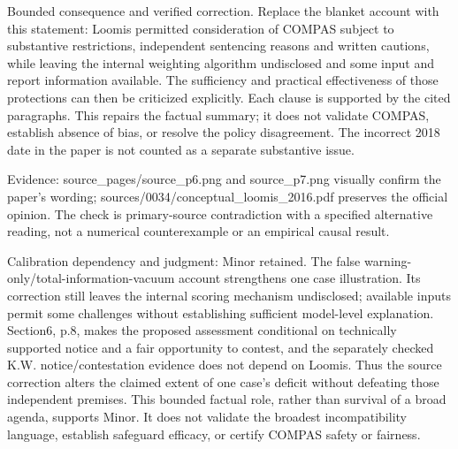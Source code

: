 \documentclass[10pt]{article}
\begin{document}
Bounded consequence and verified correction. Replace the blanket account with this statement: Loomis permitted consideration of COMPAS subject to substantive restrictions, independent sentencing reasons and written cautions, while leaving the internal weighting algorithm undisclosed and some input and report information available. The sufficiency and practical effectiveness of those protections can then be criticized explicitly. Each clause is supported by the cited paragraphs. This repairs the factual summary; it does not validate COMPAS, establish absence of bias, or resolve the policy disagreement. The incorrect 2018 date in the paper is not counted as a separate substantive issue.\par
Evidence: source\_pages/source\_p6.png and source\_p7.png visually confirm the paper’s wording; sources/0034/conceptual\_loomis\_2016.pdf preserves the official opinion. The check is primary-source contradiction with a specified alternative reading, not a numerical counterexample or an empirical causal result.\par
Calibration dependency and judgment: Minor retained. The false warning-only/total-information-vacuum account strengthens one case illustration. Its correction still leaves the internal scoring mechanism undisclosed; available inputs permit some challenges without establishing sufficient model-level explanation. Section6, p.8, makes the proposed assessment conditional on technically supported notice and a fair opportunity to contest, and the separately checked K.W. notice/contestation evidence does not depend on Loomis. Thus the source correction alters the claimed extent of one case’s deficit without defeating those independent premises. This bounded factual role, rather than survival of a broad agenda, supports Minor. It does not validate the broadest incompatibility language, establish safeguard efficacy, or certify COMPAS safety or fairness.\par
\end{document}
